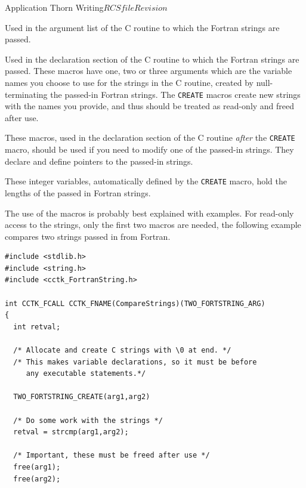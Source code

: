 \begin{cactuspart}{Application Thorn Writing}{$RCSfile$}{$Revision$}
\begin{Lentry}

\item[\texttt{<ONE|TWO|THREE>\_FORTSTRING\_ARG}]
        Used in the argument list of the C routine to which the Fortran
        strings are passed.

\item[\texttt{<ONE|TWO|THREE>\_FORTSTRING\_CREATE}]
        Used in the declaration section of the C routine to which the Fortran
        strings are passed. These macros have one, two or three arguments
        which are the variable names you choose to use for the strings in
        the C routine, created
        by null-terminating the passed-in Fortran strings. The \texttt{CREATE}
        macros create new strings with the names you provide, and thus should
        be treated as read-only and freed after use.

\item[\texttt{<ONE|TWO|THREE>\_FORTSTRING\_PTR}]
        These macros, used in the declaration section of the C routine
        \emph{after} the \texttt{CREATE} macro,
        should be used if you need to modify one of the passed-in strings.
        They declare and define pointers to the passed-in strings.

\item[\texttt{cctk\_strlen<1|2|3>}] These integer variables,
        automatically defined by
        the \texttt{CREATE} macro, hold the lengths of the passed in
        Fortran strings.
\end{Lentry}

The use of the macros is probably best explained with examples.
For read-only access to the strings, only the first two macros are needed,
the following example compares two strings passed in from Fortran.

\begin{verbatim}
#include <stdlib.h>
#include <string.h>
#include <cctk_FortranString.h>

int CCTK_FCALL CCTK_FNAME(CompareStrings)(TWO_FORTSTRING_ARG)
{
  int retval;

  /* Allocate and create C strings with \0 at end. */
  /* This makes variable declarations, so it must be before
     any executable statements.*/

  TWO_FORTSTRING_CREATE(arg1,arg2)

  /* Do some work with the strings */
  retval = strcmp(arg1,arg2);

  /* Important, these must be freed after use */
  free(arg1);
  free(arg2);


\end{verbatim}
\end{cactuspart}

